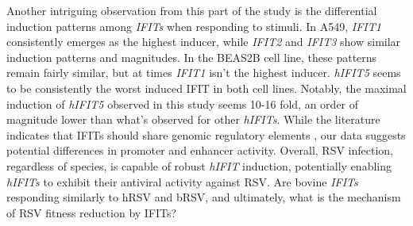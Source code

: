 Another intriguing observation from this part of the study is the differential induction patterns among \textit{IFITs} when responding to stimuli. In A549, \textit{IFIT1} consistently emerges as the highest inducer, while \textit{IFIT2} and \textit{IFIT3} show similar induction patterns and magnitudes. In the BEAS2B cell line, these patterns remain fairly similar, but at times \textit{IFIT1} isn't the highest inducer. \textit{hIFIT5} seems to be consistently the worst induced IFIT in both cell lines. Notably, the maximal induction of \textit{hIFIT5} observed in this study seems 10-16 fold, an order of magnitude lower than what's observed for other \textit{hIFITs}. While the literature indicates that IFITs should share genomic regulatory elements \cite{Lou2009IFR-9/STAT2STAT1}, our data suggests potential differences in promoter and enhancer activity. Overall, RSV infection, regardless of species, is capable of robust \textit{hIFIT} induction, potentially enabling \textit{hIFITs} to exhibit their antiviral activity against RSV. Are bovine \textit{IFITs} responding similarly to hRSV and bRSV, and ultimately, what is the mechanism of RSV fitness reduction by IFITs?


